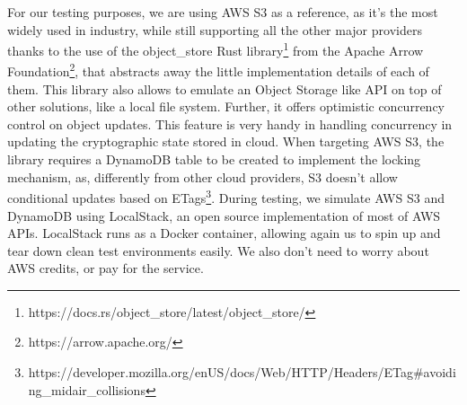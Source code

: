 For our testing purposes, we are using AWS S3 as a reference, as it's the most widely used in industry, 
while still supporting all the other major providers thanks to the use of the object\_store Rust library\footnote{https://docs.rs/object\_store/latest/object\_store/} from the Apache Arrow Foundation\footnote{https://arrow.apache.org/},
that abstracts away the little implementation details of each of them. This library also allows to emulate an Object Storage like API on top of other solutions, like a local file system.
Further, it offers optimistic concurrency control on object updates. 
This feature is very handy in handling concurrency in updating the cryptographic state stored in cloud.
When targeting AWS S3, the library requires a DynamoDB table to be created to implement the locking mechanism, as, differently from other cloud providers, S3 doesn't allow conditional updates based on ETags\footnote{https://developer.mozilla.org/en\-US/docs/Web/HTTP/Headers/ETag\#avoiding\_mid\-air\_collisions}.
During testing, we simulate AWS S3 and DynamoDB using LocalStack, an open source implementation of most of AWS APIs. LocalStack runs as a Docker container, allowing again us to spin up and tear down clean test environments easily.
We also don't need to worry about AWS credits, or pay for the service.


